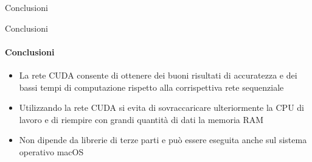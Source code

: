 \documentclass[
 ]{beamer}
\begin{document}
\begin{frame}[c]
  \centering
  \bigskip \bigskip    
  \Huge Conclusioni
\end{frame}

\begin{frame}{Conclusioni}
    \framesubtitle{Conclusioni}
    \smallskip
    \begin{itemize} [<+->]
        \setlength\itemsep{3em}
        \item \large La rete CUDA consente di ottenere dei buoni risultati di accuratezza e dei bassi tempi di computazione rispetto alla corrispettiva rete sequenziale
        \item \large Utilizzando la rete CUDA si evita di sovraccaricare ulteriormente la CPU di lavoro e di riempire con grandi quantità di dati la memoria RAM 
        \item \large Non dipende da librerie di terze parti e può essere eseguita anche sul sistema operativo macOS
    \end{itemize}     
\end{frame}
\end{document}
